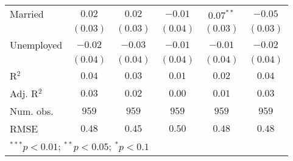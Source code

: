 \begin{table}
\begin{center}
\begin{tabular}{l c c c c c}
Married              & $0.02$        & $0.02$        & $-0.01$     & $0.07^{**}$ & $-0.05$       \\
                     & $(0.03)$      & $(0.03)$      & $(0.04)$    & $(0.03)$    & $(0.03)$      \\
Unemployed           & $-0.02$       & $-0.03$       & $-0.01$     & $-0.01$     & $-0.02$       \\
                     & $(0.04)$      & $(0.04)$      & $(0.04)$    & $(0.04)$    & $(0.04)$      \\
\midrule
R$^2$                & $0.04$        & $0.03$        & $0.01$      & $0.02$      & $0.04$        \\
Adj. R$^2$           & $0.03$        & $0.02$        & $0.00$      & $0.01$      & $0.03$        \\
Num. obs.            & $959$         & $959$         & $959$       & $959$       & $959$         \\
RMSE                 & $0.48$        & $0.45$        & $0.50$      & $0.48$      & $0.48$        \\
\bottomrule
\multicolumn{6}{l}{\scriptsize{$^{***}p<0.01$; $^{**}p<0.05$; $^{*}p<0.1$}}
\end{tabular}
\label{tab_risk}
\end{center}
\end{table}
